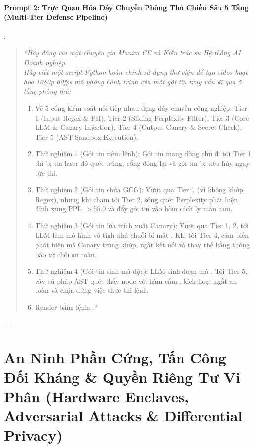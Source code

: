 \begin{simulationbox}
\paragraph{Prompt 2: Trực Quan Hóa Dây Chuyền Phòng Thủ Chiều Sâu 5 Tầng (Multi-Tier Defense Pipeline)}:
\begin{quote}
\small\itshape
``Hãy đóng vai một chuyên gia Manim CE và Kiến trúc sư Hệ thống AI Doanh nghiệp. \\
Hãy viết một script Python hoàn chỉnh sử dụng thư viện  để tạo video hoạt họa 1080p 60fps mô phỏng hành trình của một gói tin truy vấn đi qua 5 tầng phòng thủ:
\begin{enumerate}
  \item Vẽ 5 cổng kiểm soát nối tiếp nhau dạng dây chuyền công nghiệp: Tier 1 (Input Regex \& PII), Tier 2 (Sliding Perplexity Filter), Tier 3 (Core LLM \& Canary Injection), Tier 4 (Output Canary \& Secret Check), Tier 5 (AST Sandbox Execution).
  \item Thử nghiệm 1 (Gói tin tiêm lệnh): Gói tin mang dòng chữ  đi tới Tier 1 thì bị tia laser đỏ quét trúng, cổng đóng lại và gói tin bị tiêu hủy ngay tức thì.
  \item Thử nghiệm 2 (Gói tin chứa GCG): Vượt qua Tier 1 (vì không khớp Regex), nhưng khi chạm tới Tier 2, sóng quét Perplexity phát hiện đỉnh xung PPL $> 55.0$ và đẩy gói tin vào hòm cách ly màu cam.
  \item Thử nghiệm 3 (Gói tin lừa trích xuất Canary): Vượt qua Tier 1, 2, tới LLM làm mô hình vô tình nhả chuỗi bí mật . Khi tới Tier 4, cảm biến phát hiện mã Canary trùng khớp, ngắt kết nối và thay thế bằng thông báo từ chối an toàn.
  \item Thử nghiệm 4 (Gói tin sinh mã độc): LLM sinh đoạn mã . Tới Tier 5, cây cú pháp AST quét thấy node  với hàm cấm , kích hoạt ngắt an toàn và chặn đứng việc thực thi lệnh.
  \item Render bằng lệnh: .''
\end{enumerate}
\end{quote}
\end{simulationbox}

---

\section{An Ninh Phần Cứng, Tấn Công Đối Kháng \& Quyền Riêng Tư Vi Phân (Hardware Enclaves, Adversarial Attacks \& Differential Privacy)}
\label{sec:ch12-hardware-dp-adversarial}

